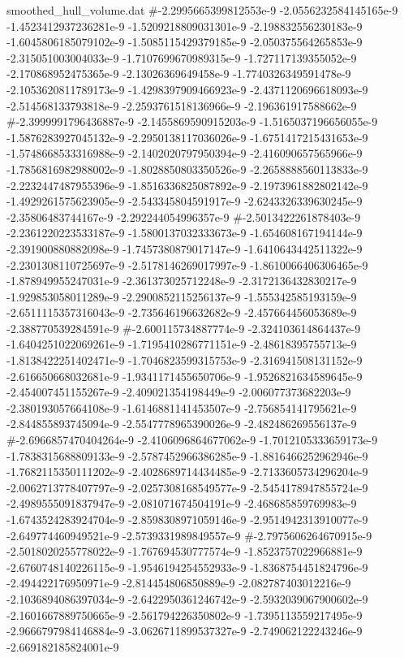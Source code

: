 \begin{filecontents}{smoothed_hull_volume.dat}
#-2.2995665399812553e-9	-2.0556232584145165e-9	-1.4523412937236281e-9	-1.5209218809031301e-9	-2.198832556230183e-9	-1.6045806185079102e-9	-1.5085115429379185e-9	-2.050375564265853e-9	-2.315051003004033e-9	-1.7107699670989315e-9	-1.727117139355052e-9	-2.170868952475365e-9	-2.13026369649458e-9	-1.7740326349591478e-9	-2.1053620811789173e-9	-1.4298397909466923e-9	-2.4371120696618093e-9	-2.514568133793818e-9	-2.2593761518136966e-9	-2.196361917588662e-9
#-2.3999991796436887e-9	-2.1455869590915203e-9	-1.5165037196656055e-9	-1.5876283927045132e-9	-2.2950138117036026e-9	-1.6751417215431653e-9	-1.5748668533316988e-9	-2.1402020797950394e-9	-2.416090657565966e-9	-1.7856816982988002e-9	-1.8028850803350526e-9	-2.2658888560113833e-9	-2.2232447487955396e-9	-1.8516336825087892e-9	-2.1973961882802142e-9	-1.4929261575623905e-9	-2.543345804591917e-9	-2.6243326339630245e-9	-2.35806483744167e-9	-2.292244054996357e-9
#-2.5013422261878403e-9	-2.2361220223533187e-9	-1.5800137032333673e-9	-1.654608167194144e-9	-2.391900880882098e-9	-1.7457380879017147e-9	-1.6410643442511322e-9	-2.2301308110725697e-9	-2.5178146269017997e-9	-1.8610066406306465e-9	-1.878949955247031e-9	-2.361373025712248e-9	-2.3172136432830217e-9	-1.929853058011289e-9	-2.2900852115256137e-9	-1.555342585193159e-9	-2.6511115357316043e-9	-2.735646196632682e-9	-2.457664456053689e-9	-2.388770539284591e-9
#-2.600115734887774e-9	-2.324103614864437e-9	-1.6404251022069261e-9	-1.7195410286771151e-9	-2.48618395755713e-9	-1.8138422251402471e-9	-1.7046823599315753e-9	-2.316941508131152e-9	-2.616650668032681e-9	-1.9341171455650706e-9	-1.9526821634589645e-9	-2.454007451155267e-9	-2.409021354198449e-9	-2.006077373682203e-9	-2.380193057664108e-9	-1.6146881141453507e-9	-2.756854141795621e-9	-2.844855893745094e-9	-2.5547778965390026e-9	-2.482486269556137e-9
#-2.6966857470404264e-9	-2.4106096864677062e-9	-1.7012105333659173e-9	-1.7838315688809133e-9	-2.5787452966386285e-9	-1.8816466252962946e-9	-1.7682115350111202e-9	-2.4028689714434485e-9	-2.7133605734296204e-9	-2.0062713778407797e-9	-2.0257308168549577e-9	-2.5454178947855724e-9	-2.4989555091837947e-9	-2.081071674504191e-9	-2.468685859769983e-9	-1.6743524283924704e-9	-2.8598308971059146e-9	-2.9514942313910077e-9	-2.649774460949521e-9	-2.5739331989849557e-9
#-2.7975606264670915e-9	-2.5018020255778022e-9	-1.767694530777574e-9	-1.8523757022966881e-9	-2.6760748140226115e-9	-1.9546194254552933e-9	-1.8368754451824796e-9	-2.494422176950971e-9	-2.814454806850889e-9	-2.082787403012216e-9	-2.1036894086397034e-9	-2.6422950361246742e-9	-2.5932039067900602e-9	-2.1601667889750665e-9	-2.561794226350802e-9	-1.7395113559217495e-9	-2.9666797984146884e-9	-3.0626711899537327e-9	-2.749062122243246e-9	-2.669182185824001e-9

\end{filecontents}
